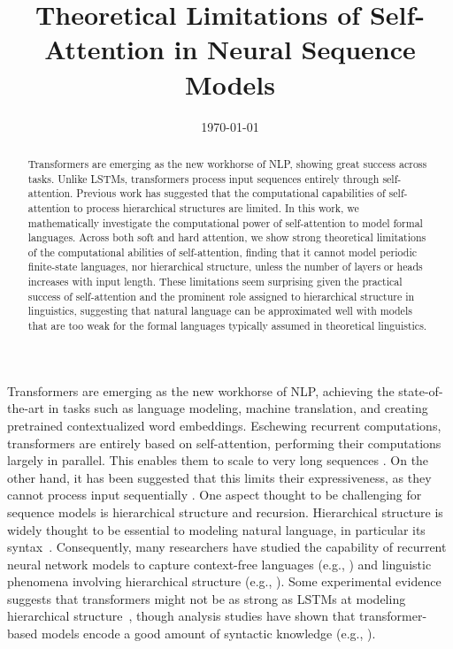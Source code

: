 \documentclass[11pt,a4paper]{article}
\title{Theoretical Limitations of Self-Attention in Neural Sequence Models}
\date{\today}
\begin{document}
\maketitle
\begin{abstract}
Transformers are emerging as the new workhorse of NLP, showing great success across tasks.
Unlike LSTMs, transformers process input sequences entirely through self-attention.
Previous work has suggested that the computational capabilities of self-attention to process hierarchical structures are limited.
In this work, we mathematically investigate the computational power of self-attention to model formal languages.
Across both soft and hard attention, we show strong theoretical limitations of the computational abilities of self-attention, finding that it cannot model periodic finite-state languages, nor hierarchical structure, unless the number of layers or heads increases with input length.
These limitations seem surprising given the practical success of self-attention and the prominent role assigned to hierarchical structure in linguistics, suggesting that natural language can be approximated well with models that are too weak for the formal languages typically assumed in theoretical linguistics. %
\end{abstract}


Transformers are emerging as the new workhorse of NLP, achieving the state-of-the-art in tasks such as language modeling, machine translation, and creating pretrained contextualized word embeddings.
Eschewing recurrent computations, transformers are entirely based on self-attention, performing their computations largely in parallel.
This enables them to scale to very long sequences \cite{vaswani2017attention,dai2019transformer,child2019generating}.
On the other hand, it has been suggested that this limits their expressiveness, as they cannot process input sequentially \cite{tran2018importance,dehghani2018universal,shen2018disan,chen2018best,hao2019modeling}.
One aspect thought to be challenging for sequence models is hierarchical structure and recursion.
Hierarchical structure is widely thought to be essential to modeling natural language, in particular its syntax~\cite{everaert2015structures}.
Consequently, many researchers have studied the capability of recurrent neural network models to capture context-free languages (e.g., \citet{kalinke1998computation,gers2001lstm,gruning2006stack,weiss2018practical,sennhauser2018evaluating,korsky2019computational}) and linguistic phenomena involving hierarchical structure (e.g., \citet{linzen2016assessing,gulordava2018colorless}).
Some experimental evidence suggests that transformers might not be as strong as LSTMs at modeling hierarchical structure~\cite{tran2018importance}, though analysis studies have shown that transformer-based models encode a good amount of syntactic knowledge (e.g., \citet{clark2019bert,lin2019open,tenney2019bert}).
\end{document}

